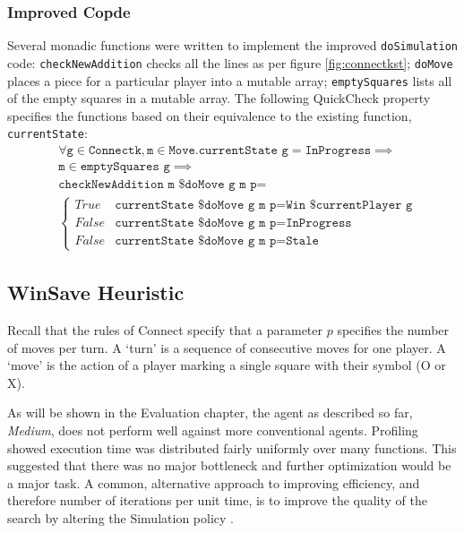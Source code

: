 \subsubsection{Improved Copde}
Several monadic functions were written to implement the improved \texttt{doSimulation} code: \texttt{checkNewAddition} checks all the lines as per figure \ref{fig:connectkst}; \texttt{doMove} places a piece for a particular player into a mutable array; \texttt{emptySquares} lists all of the empty squares in a mutable array. The following QuickCheck property specifies the functions based on their equivalence to the existing function, \texttt{currentState}:
\begin{equation}
\begin{split}
&\forall\texttt{g}\in\texttt{Connectk},\texttt{m}\in\texttt{Move}.\texttt{currentState g}=\texttt{InProgress}\implies\\
&\texttt{m}\in \texttt{emptySquares g}\implies\\
&\texttt{checkNewAddition m \$ doMove g m p} = \\
&\begin{cases}
True  &\texttt{currentState \$ doMove g m p} = \texttt{Win \$ currentPlayer g}\\
False &\texttt{currentState \$ doMove g m p} = \texttt{InProgress}\\
False &\texttt{currentState \$ doMove g m p} = \texttt{Stale}
\end{cases}
\end{split}
\nonumber
\end{equation}


\subsection{{WinSave} Heuristic\label{sec:needchooseprime}}
Recall that the rules of {Connect} specify that a parameter $p$ specifies the number of moves per turn. A `turn' is a sequence of consecutive moves for one player. A `move' is the action of a player marking a single square with their symbol (O or X).

As will be shown in the Evaluation chapter, the agent as described so far, \textit{Medium}, does not perform well against more conventional agents. Profiling showed execution time was distributed fairly uniformly over many functions. This suggested that there was no major bottleneck and further optimization would be a major task. A common, alternative approach to improving efficiency, and therefore number of iterations per unit time, is to improve the quality of the search by altering the Simulation policy \cite{survey}.

